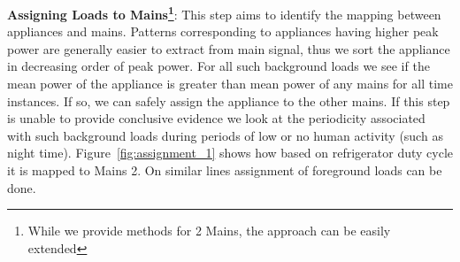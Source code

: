 \documentclass[conference]{IEEEtran}
\newcommand{\figref}[1]{Figure~\ref{#1}}
\begin{document}
\textbf{Assigning Loads to Mains\footnote{While we provide methods for 2 Mains, the approach can be easily extended}}:
This step aims to identify the mapping between appliances and mains. Patterns corresponding to appliances having higher peak power are generally easier to extract from main signal, thus we sort the appliance in decreasing order of peak power. For all such background loads we see if the mean power of the appliance is greater than mean power of any mains for all time instances. If so, we can safely assign the appliance to the other mains. If this step is unable to provide conclusive evidence we look at the periodicity associated with such background loads during periods of low or no human activity (such as night time). \figref{fig:assignment_1} shows how based on refrigerator duty cycle it is mapped to Mains 2. On similar lines assignment of foreground loads can be done.
\end{document}
